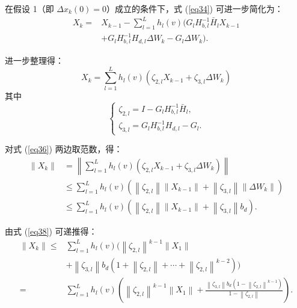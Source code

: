 在假设 1（即 $\Delta x_k(0) = 0$）成立的条件下，式 (\ref{eq34}) 可进一步简化为：
\begin{equation}
\begin{aligned}
X_k = & X_{k-1} - \sum_{l=1}^{L} h_l(v) \Big( G_l H_{b,l}^{-1} \bar{H}_l X_{k-1} \\
& + G_l H_{b,l}^{-1} H_{d,l} \Delta W_k - G_l \Delta W_k \Big).
\end{aligned}
\end{equation}

进一步整理得：
\begin{equation}
X_k = \sum_{l=1}^{L} h_l(v) \left( \zeta_{2,l} X_{k-1} + \zeta_{3,l} \Delta W_k \right)
\label{eq36}
\end{equation}
其中
\begin{equation}
\left\{
\begin{array}{l}
\zeta_{2,l} = I - G_l H_{b,l}^{-1} \bar{H}_l, \\
\zeta_{3,l} = G_l H_{b,l}^{-1} H_{d,l} - G_l.
\end{array}
\right.
\label{eq37}
\end{equation}

对式 (\ref{eq36}) 两边取范数，得：
\begin{equation}
\begin{aligned}
\left\|X_k\right\| 
&= \left\| \sum_{l=1}^{L} h_l(v) \left( \zeta_{2,l} X_{k-1} + \zeta_{3,l} \Delta W_k \right) \right\| \\
&\leq \sum_{l=1}^{L} h_l(v) \left( \left\|\zeta_{2,l}\right\| \left\|X_{k-1}\right\| + \left\|\zeta_{3,l}\right\| \left\|\Delta W_k\right\| \right) \\
&\leq \sum_{l=1}^{L} h_l(v) \left( \left\|\zeta_{2,l}\right\| \left\|X_{k-1}\right\| + \left\|\zeta_{3,l}\right\| b_d \right).
\end{aligned}
\label{eq38}
\end{equation}

由式 (\ref{eq38}) 可递推得：
\begin{equation}
\begin{aligned}
\left\|X_k\right\| \leq & \sum_{l=1}^{L} h_l(v) \Big( \left\|\zeta_{2,l}\right\|^{k-1} \left\|X_1\right\| \\
& + \left\|\zeta_{3,l}\right\| b_d \left( 1 + \left\|\zeta_{2,l}\right\| + \cdots + \left\|\zeta_{2,l}\right\|^{k-2} \right) \Big) \\
= & \sum_{l=1}^{L} h_l(v) \left( \left\|\zeta_{2,l}\right\|^{k-1} \left\|X_1\right\| + \frac{ \left\|\zeta_{3,l}\right\| b_d \left( 1 - \left\|\zeta_{2,l}\right\|^{k-1} \right) }{ 1 - \left\|\zeta_{2,l}\right\| } \right).
\end{aligned}
\label{eq39}
\end{equation}

